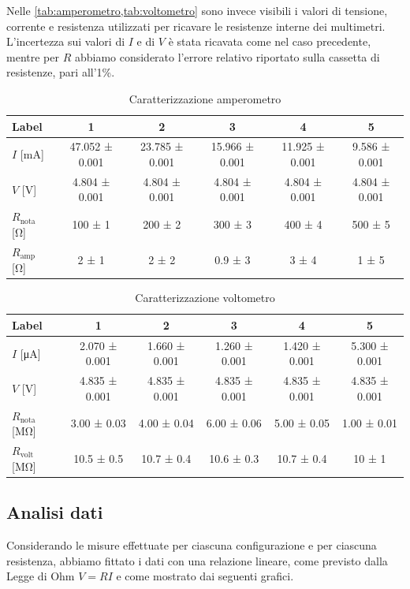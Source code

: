 \documentclass[a4paper]{article}
\begin{document}
Nelle \cref{tab:amperometro,tab:voltometro} sono invece visibili i valori di tensione, corrente e resistenza utilizzati per ricavare le resistenze interne dei multimetri.
L'incertezza sui valori di \(I\) e di \(V\) è stata ricavata come nel caso precedente, mentre per \(R\) abbiamo considerato l'errore relativo
riportato sulla cassetta di resistenze, pari all'1\%.

\begin{table}[htbp]
\centering
\caption{Caratterizzazione amperometro}
\label{tab:amperometro}
\begin{tabular}{|l|ccccc|}
\hline
Label & 1 & 2 & 3 & 4 & 5 \\\hline\hline
$I$ [\si{\milli\ampere}]& 47.052 ± 0.001 & 23.785 ± 0.001 & 15.966 ± 0.001 & 11.925 ± 0.001 & 9.586 ± 0.001 \\\hline
$V$ [\si{\volt}] & 4.804 ± 0.001 & 4.804 ± 0.001 & 4.804 ± 0.001 & 4.804 ± 0.001 & 4.804 ± 0.001 \\\hline
$R_{\text{nota}}$ [\si{\ohm}] & 100 ± 1 & 200 ± 2 & 300 ± 3 & 400 ± 4 & 500 ± 5 \\\hline
$R_{\text{amp}}$ [\si{\ohm}] & 2 ± 1 & 2 ± 2 & 0.9 ± 3 & 3 ± 4 & 1 ± 5 \\\hline
\end{tabular}
\end{table}

\begin{table}[htbp]
\centering
\caption{Caratterizzazione voltometro}
\label{tab:voltometro}
\begin{tabular}{|l|ccccc|}
\hline
Label & 1 & 2 & 3 & 4 & 5 \\\hline\hline
$I$ [\si{\micro\ampere}]& 2.070 ± 0.001 & 1.660 ± 0.001 & 1.260 ± 0.001 & 1.420 ± 0.001 & 5.300 ± 0.001 \\\hline
$V$ [\si{\volt}] & 4.835 ± 0.001 & 4.835 ± 0.001 & 4.835 ± 0.001 & 4.835 ± 0.001 & 4.835 ± 0.001 \\\hline
$R_{\text{nota}}$ [\si{\mega\ohm}] & 3.00 ± 0.03 & 4.00 ± 0.04 & 6.00 ± 0.06 & 5.00 ± 0.05 & 1.00 ± 0.01 \\\hline
$R_{\text{volt}}$ [\si{\mega\ohm}] & 10.5 ± 0.5 & 10.7 ± 0.4 & 10.6 ± 0.3 & 10.7 ± 0.4 & 10 ± 1 \\\hline
\end{tabular}
\end{table}

\subsection{Analisi dati}
Considerando le misure effettuate per ciascuna configurazione e per ciascuna resistenza, abbiamo fittato i dati con una relazione lineare, come previsto dalla Legge di Ohm \( V = RI \) e come mostrato dai seguenti grafici.
\end{document}
